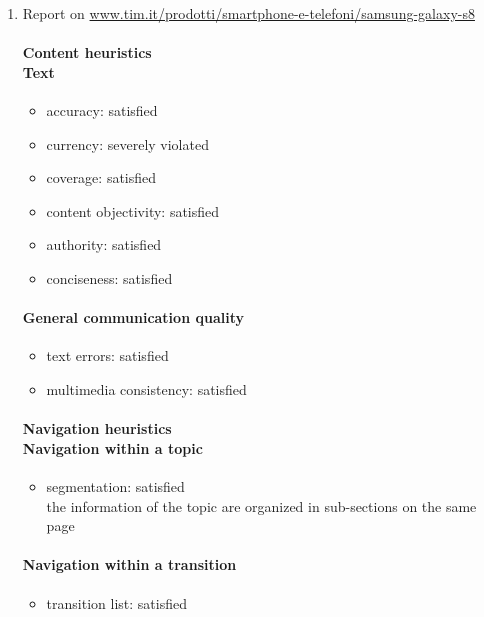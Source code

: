 \begin{enumerate}

\item Report on \url{www.tim.it/prodotti/smartphone-e-telefoni/samsung-galaxy-s8}
	\paragraph*{Content heuristics \\ Text}
	\begin{itemize}
		\item accuracy: satisfied
		\item currency: severely violated
		\item coverage: satisfied
		\item content objectivity: satisfied
		\item authority: satisfied
		\item conciseness: satisfied		
	\end{itemize}

	\paragraph*{General communication quality}
	\begin{itemize}
		\item text errors: satisfied
		\item multimedia consistency: satisfied
	\end{itemize}

	\paragraph*{Navigation heuristics \\ Navigation within a topic}
	\begin{itemize}
		\item segmentation: satisfied\\
		the information of the topic are organized in sub-sections on the same page
	\end{itemize}	

	\paragraph*{Navigation within a transition}
	\begin{itemize}
		\item transition list: satisfied
	\end{itemize}


\end{enumerate}
